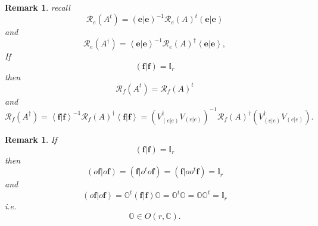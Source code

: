 \documentclass[aps,preprint]{revtex4}%
\newtheorem{remark}[theorem]{Remark}
\begin{document}
\begin{remark}
recall%
\begin{equation}
\mathcal{R}_{e}\left(  A^{t}\right)  =\left(  \left.  \mathbf{e}\right\vert
\mathbf{e}\right)  ^{-1}\mathcal{R}_{e}\left(  A\right)  ^{t}\left(  \left.
\mathbf{e}\right\vert \mathbf{e}\right)
\end{equation}
and
\begin{equation}
\mathcal{R}_{e}\left(  A^{\dagger}\right)  =\left\langle \left.
\mathbf{e}\right\vert \mathbf{e}\right\rangle ^{-1}\mathcal{R}_{e}\left(
A\right)  ^{\dagger}\left\langle \left.  \mathbf{e}\right\vert \mathbf{e}%
\right\rangle ,
\end{equation}
If
\begin{equation}
\left(  \left.  \mathbf{f}\right\vert \mathbf{f}\right)  =\mathbb{I}_{r}%
\end{equation}
then
\begin{equation}
\mathcal{R}_{f}\left(  A^{t}\right)  =\mathcal{R}_{f}\left(  A\right)  ^{t}%
\end{equation}
and
\begin{equation}
\mathcal{R}_{f}\left(  A^{\dagger}\right)  =\left\langle \left.
\mathbf{f}\right\vert \mathbf{f}\right\rangle ^{-1}\mathcal{R}_{f}\left(
A\right)  ^{\dagger}\left\langle \left.  \mathbf{f}\right\vert \mathbf{f}%
\right\rangle =\left(  V_{\left(  \left.  e\right\vert e\right)  }^{\dagger
}V_{\left(  \left.  e\right\vert e\right)  }\right)  ^{-1}\mathcal{R}%
_{f}\left(  A\right)  ^{\dagger}\left(  V_{\left(  \left.  e\right\vert
e\right)  }^{\dagger}V_{\left(  \left.  e\right\vert e\right)  }\right)  .
\end{equation}

\end{remark}

\begin{remark}
If
\begin{equation}
\left(  \left.  \mathbf{f}\right\vert \mathbf{f}\right)  =\mathbb{I}_{r}%
\end{equation}
then
\begin{equation}
\left(  \left.  o\mathbf{f}\right\vert o\mathbf{f}\right)  =\left(  \left.
\mathbf{f}\right\vert o^{t}o\mathbf{f}\right)  =\left(  \left.  \mathbf{f}%
\right\vert oo^{t}\mathbf{f}\right)  =\mathbb{I}_{r}%
\end{equation}
and
\begin{equation}
\left(  \left.  o\mathbf{f}\right\vert o\mathbf{f}\right)  =\mathbb{O}%
^{t}\left(  \left.  \mathbf{f}\right\vert \mathbf{f}\right)  \mathbb{O}%
=\mathbb{O}^{t}\mathbb{O}=\mathbb{OO}^{t}=\mathbb{I}_{r}%
\end{equation}
i.e.%
\begin{equation}
\mathbb{O}\in O\left(  r,\mathbb{C}\right)  .
\end{equation}

\end{remark}
\end{document}
